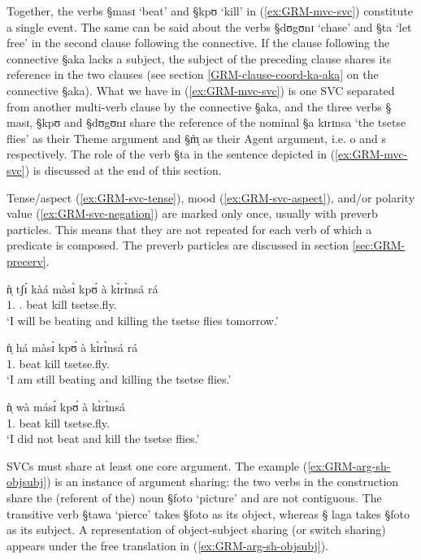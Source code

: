 Together,  the verbs {\S masɪ} `beat' and  {\S kpʊ} `kill'  in 
(\ref{ex:GRM-mvc-svc})  constitute a single event.  The same can be said about 
the verbs {\S dʊgʊnɪ} `chase' and {\S ta} `let free' in the second clause
following the connective.   If the clause following the connective   {\S aka}
lacks a subject,  the subject of the preceding clause shares its reference in
the two clauses   (see section \ref{GRM-clause-coord-ka-aka} on the connective 
{\S aka}). What we have in (\ref{ex:GRM-mvc-svc}) is one SVC separated from
another multi-verb clause by the connective {\S aka},  and the three verbs {\S
masɪ},  {\S kpʊ} and {\S dʊgʊnɪ}  share the reference of the  nominal {\S a
kɪrɪnsa} `the tsetse flies' as their Theme argument and {\S m̩̀} as their Agent
argument, i.e. {\sc o} and {\sc s} respectively. The role of  the verb {\S ta}
in the sentence depicted in  (\ref{ex:GRM-mvc-svc}) is discussed at the end of
this section.

Tense/aspect (\ref{ex:GRM-svc-tense}), mood (\ref{ex:GRM-svc-aspect}), and/or
polarity value (\ref{ex:GRM-svc-negation}) are marked only once, usually with
preverb particles. This means that they are not repeated for each verb of which
a predicate is composed. The preverb particles are discussed in section
\ref{sec:GRM-precerv}.


\begin{exe}
\ex\label{ex:GRM-svc-preverb}
\begin{xlist}
 \ex\label{ex:GRM-svc-tense}
\gll  ǹ̩ tʃɪ́ kàá màsɪ̀ 	kpʊ́   à   	kɪ̀rɪ̀nsá rá\\
{1.\sg} {\cras} {\fut.\prog} 	beat 	kill 	 {\art} tsetse.fly.{\pl}
{\foc}\\ 
\glt `I will be beating and killing the tsetse flies tomorrow.'

 \ex\label{ex:GRM-svc-aspect}
\gll  ǹ̩  há màsɪ̀ 	kpʊ́   à   	kɪ̀rɪ̀nsá rá\\
	{1.\sg}  {\mod} 	beat 	kill 	 {\art} tsetse.fly.{\pl}
{\foc} \\
 `I am still beating  and killing the tsetse flies.'

 \ex\label{ex:GRM-svc-negation}
\gll  ǹ̩   wà másɪ́ 	kpʊ́   à   	kɪ̀rɪ̀nsá\\
	{1.\sg}  {\neg} 	beat 	kill 	 {\art}
tsetse.fly.{\pl}\\
 `I did not beat and kill the tsetse flies.'
\end{xlist}
\end{exe}

SVCs must share at least one core  argument. The example 
(\ref{ex:GRM-arg-sh-objsubj}) is an instance of argument sharing: the two verbs
in the construction share the (referent of the) noun {\S foto} `picture' and
are not contiguous. The
transitive verb {\S tawa} `pierce' takes  {\S foto} as its object, whereas {\S
laga} takes  {\S foto} as its subject. A representation of object-subject
sharing (or switch sharing) appears under the free translation in
(\ref{ex:GRM-arg-sh-objsubj}).

